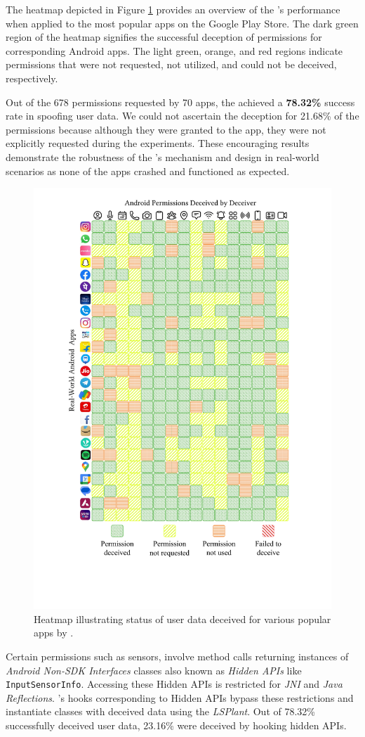 The heatmap depicted in Figure \ref{fig:intro_heatmap} provides an overview of the \framework{}'s performance when applied to the most popular apps on the Google Play Store. The dark green region of the heatmap signifies the successful deception of permissions for corresponding Android apps. The light green, orange, and red regions indicate permissions that were not requested, not utilized, and could not be deceived, respectively. 

Out of the 678 permissions requested by 70 apps, the \framework{} achieved a \textbf{78.32\%} success rate in spoofing user data. We could not ascertain the deception for 21.68\% of the permissions because although they were granted to the app, they were not explicitly requested during the experiments. These encouraging results demonstrate the robustness of the \framework{}'s mechanism and design in real-world scenarios as none of the apps crashed and functioned as expected.

\begin{figure}[t]
    \centering
    \includegraphics[width=0.6\linewidth]{Figures/Introduction/heatmap.pdf}
    \caption{Heatmap illustrating status of user data deceived for various popular apps by \framework{}.}
    \label{fig:intro_heatmap}
\end{figure}

Certain permissions such as sensors, involve method calls returning instances of \textit{Android Non-SDK Interfaces} classes also known as \textit{Hidden APIs} like \texttt{InputSensorInfo}. Accessing these Hidden APIs is restricted for \textit{JNI} and \textit{Java Reflections}. \framework{}'s hooks corresponding to Hidden APIs bypass these restrictions and instantiate classes with deceived data using the \textit{LSPlant}. Out of 78.32\% successfully deceived user data, 23.16\% were deceived by hooking hidden APIs.

